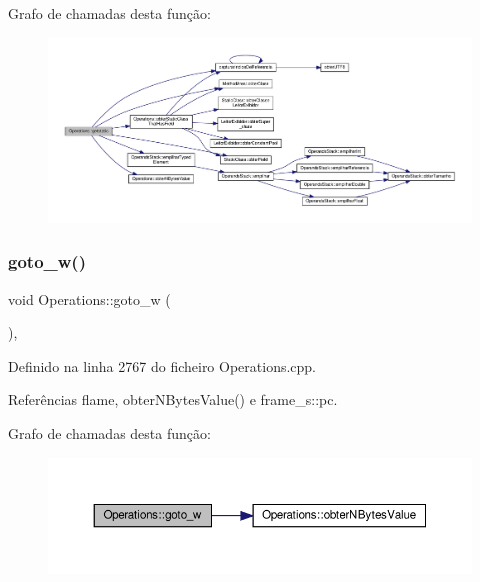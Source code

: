Grafo de chamadas desta função\+:
\nopagebreak
\begin{figure}[H]
\begin{center}
\leavevmode
\includegraphics[width=350pt]{classOperations_a0514422a81aa3efa5cb8b3bd1a505a68_cgraph}
\end{center}
\end{figure}
\mbox{\label{classOperations_aed8436ead5dfcaef69b24e1b2fff7744}} 
\subsubsection{\texorpdfstring{goto\+\_\+w()}{goto\_w()}}
{\footnotesize\ttfamily void Operations\+::goto\+\_\+w (\begin{DoxyParamCaption}{ }\end{DoxyParamCaption})\hspace{0.3cm}{\ttfamily [static]}, {\ttfamily [private]}}



Definido na linha 2767 do ficheiro Operations.\+cpp.



Referências flame, obter\+N\+Bytes\+Value() e frame\+\_\+s\+::pc.

Grafo de chamadas desta função\+:
\nopagebreak
\begin{figure}[H]
\begin{center}
\leavevmode
\includegraphics[width=350pt]{classOperations_aed8436ead5dfcaef69b24e1b2fff7744_cgraph}
\end{center}
\end{figure}
\mbox{\label{classOperations_adfe0344bae5a1252330b7324e827ed35}} 

